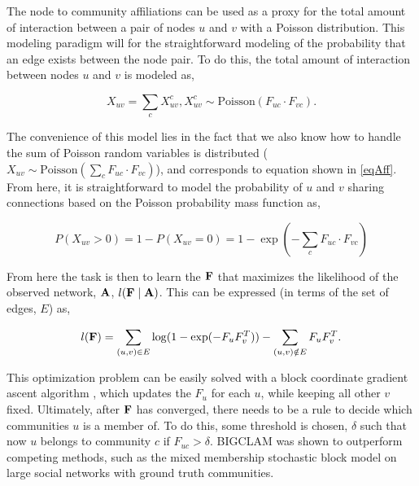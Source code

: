 The node to community affiliations can be used as a proxy for the total amount of interaction between a pair of nodes $u$ and $v$ with a Poisson distribution. This modeling paradigm will for the straightforward modeling of the probability that an edge exists between the node pair. To do this, the total amount of interaction between nodes $u$ and $v$ is modeled as,

\begin{equation}
X_{uv}=\sum_{c}X_{uv}^{c}, X_{uv}^{c} \sim \text{Poisson}(F_{uc}\cdot F_{vc}).
\end{equation}

The convenience of this model lies in the fact that we also know how to handle the sum of Poisson random variables is distributed ($X_{uv} \sim \text{Poisson}(\sum_{c}F_{uc}\cdot F_{vc})$), and corresponds to equation shown in \ref{eqAff}. From here, it is straightforward to model the probability of $u$ and $v$ sharing connections based on the Poisson probability mass function as,

\begin{equation}
P(X_{uv}>0)=1-P(X_{uv}=0)=1-\exp(-\sum_{c}F_{uc}\cdot F_{vc})
\end{equation}

From here the task is then to learn the ${\bf F}$ that maximizes the likelihood of the observed network, ${\bf A}$, $l({\bf F} \mid {\bf A})$. This can be expressed (in terms of the set of edges, $E$) as,

\begin{equation}
l({\bf F})=\sum_{(u,v) \in E} \log(1-\exp(-F_{u}F_{v}^{T}))- \sum_{(u,v) \notin E} F_{u}F_{v}^{T}.
\end{equation}

This optimization problem can be easily solved with a block coordinate gradient ascent algorithm , which updates the $F_{u}$ for each $u$, while keeping all other $v$ fixed. Ultimately, after ${\bf F}$ has converged, there needs to be a rule to decide which communities $u$ is a member of. To do this, some threshold is chosen, $\delta$ such that now $u$ belongs to community $c$ if $F_{uc}>\delta$. BIGCLAM was shown to outperform competing methods, such as the mixed membership stochastic block model on large social networks with ground truth communities. 


